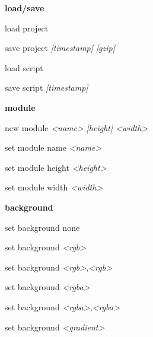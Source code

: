 \documentclass[a4paper,10pt,oneside]{article}
\begin{document}
\textbf{load/save}

load project

save project \textit{[timestamp]} \textit{[gzip]}
                                                  
load script

save script \textit{[timestamp]}

\textbf{module}

new module        \textit{<name>} \textit{[height]} \textit{<width>}

set module name   \textit{<name>}

set module height \textit{<height>}

set module width  \textit{<width>}


\textbf{background}

set background none

set background \textit{<rgb>}

set background \textit{<rgb>},\textit{<rgb>}

set background \textit{<rgba>}

set background \textit{<rgba>},\textit{<rgba>}

set background \textit{<gradient>}
\end{document}
